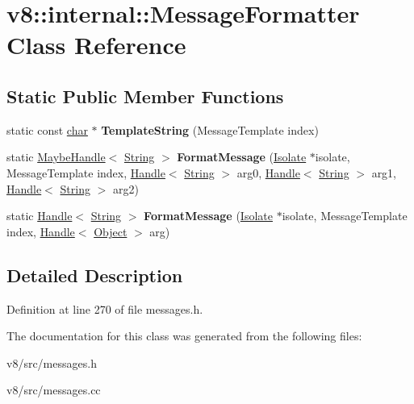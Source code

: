 \hypertarget{classv8_1_1internal_1_1MessageFormatter}{}\section{v8\+:\+:internal\+:\+:Message\+Formatter Class Reference}
\label{classv8_1_1internal_1_1MessageFormatter}
\subsection*{Static Public Member Functions}
\begin{DoxyCompactItemize}
\item 
\mbox{\label{classv8_1_1internal_1_1MessageFormatter_a03072b2b028db2175b20de8e1c18b220}} 
static const \mbox{\hyperlink{classchar}{char}} $\ast$ {\bfseries Template\+String} (Message\+Template index)
\item 
\mbox{\label{classv8_1_1internal_1_1MessageFormatter_af3ac67d412e698c3f31472d37cbb95f5}} 
static \mbox{\hyperlink{classv8_1_1internal_1_1MaybeHandle}{Maybe\+Handle}}$<$ \mbox{\hyperlink{classv8_1_1internal_1_1String}{String}} $>$ {\bfseries Format\+Message} (\mbox{\hyperlink{classv8_1_1internal_1_1Isolate}{Isolate}} $\ast$isolate, Message\+Template index, \mbox{\hyperlink{classv8_1_1internal_1_1Handle}{Handle}}$<$ \mbox{\hyperlink{classv8_1_1internal_1_1String}{String}} $>$ arg0, \mbox{\hyperlink{classv8_1_1internal_1_1Handle}{Handle}}$<$ \mbox{\hyperlink{classv8_1_1internal_1_1String}{String}} $>$ arg1, \mbox{\hyperlink{classv8_1_1internal_1_1Handle}{Handle}}$<$ \mbox{\hyperlink{classv8_1_1internal_1_1String}{String}} $>$ arg2)
\item 
\mbox{\label{classv8_1_1internal_1_1MessageFormatter_a2fa0cb2a49daf3b0f0d5a7b005128ab9}} 
static \mbox{\hyperlink{classv8_1_1internal_1_1Handle}{Handle}}$<$ \mbox{\hyperlink{classv8_1_1internal_1_1String}{String}} $>$ {\bfseries Format\+Message} (\mbox{\hyperlink{classv8_1_1internal_1_1Isolate}{Isolate}} $\ast$isolate, Message\+Template index, \mbox{\hyperlink{classv8_1_1internal_1_1Handle}{Handle}}$<$ \mbox{\hyperlink{classv8_1_1internal_1_1Object}{Object}} $>$ arg)
\end{DoxyCompactItemize}


\subsection{Detailed Description}


Definition at line 270 of file messages.\+h.



The documentation for this class was generated from the following files\+:\begin{DoxyCompactItemize}
\item 
v8/src/messages.\+h\item 
v8/src/messages.\+cc\end{DoxyCompactItemize}
